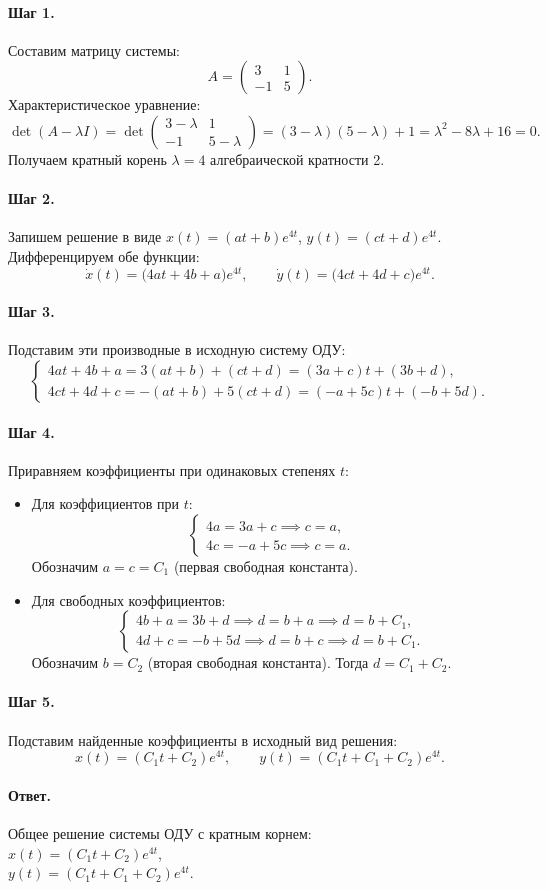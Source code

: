 \documentclass[12pt,a4paper]{article}
\theoremstyle{solution}
\newcommand{\answer}{\paragraph{Ответ.}}
\newcommand{\step}[1]{\paragraph{Шаг #1.}}
\begin{document}
\step{1} Составим матрицу системы:
\[
A = \begin{pmatrix} 3 & 1 \\ -1 & 5 \end{pmatrix}.
\]
Характеристическое уравнение:
\[
\det(A - \lambda I) = \det \begin{pmatrix} 3-\lambda & 1 \\ -1 & 5-\lambda \end{pmatrix} = (3-\lambda)(5-\lambda) + 1 = \lambda^2 - 8\lambda + 16 = 0.
\]
Получаем кратный корень $\lambda = 4$ алгебраической кратности 2.

\step{2} Запишем решение в виде $x(t) = (at + b)e^{4t}$, $y(t) = (ct + d)e^{4t}$. Дифференцируем обе функции:
\[
\dot{x}(t) = \big( 4at + 4b + a \big)e^{4t}, \qquad \dot{y}(t) = \big( 4ct + 4d + c \big)e^{4t}.
\]

\step{3} Подставим эти производные в исходную систему ОДУ:
\[
\begin{cases}
4at + 4b + a = 3(at + b) + (ct + d) = (3a + c)t + (3b + d), \\
4ct + 4d + c = -(at + b) + 5(ct + d) = (-a + 5c)t + (-b + 5d).
\end{cases}
\]

\step{4} Приравняем коэффициенты при одинаковых степенях $t$:
\begin{itemize}
    \item Для коэффициентов при $t$:
    \[
    \begin{cases}
    4a = 3a + c \implies c = a, \\
    4c = -a + 5c \implies c = a.
    \end{cases}
    \]
    Обозначим $a = c = C_1$ (первая свободная константа).
    \item Для свободных коэффициентов:
    \[
    \begin{cases}
    4b + a = 3b + d \implies d = b + a \implies d = b + C_1, \\
    4d + c = -b + 5d \implies d = b + c \implies d = b + C_1.
    \end{cases}
    \]
    Обозначим $b = C_2$ (вторая свободная константа). Тогда $d = C_1 + C_2$.
\end{itemize}

\step{5} Подставим найденные коэффициенты в исходный вид решения:
\[
x(t) = (C_1 t + C_2)e^{4t}, \qquad y(t) = (C_1 t + C_1 + C_2)e^{4t}.
\]

\answer
Общее решение системы ОДУ с кратным корнем: \\
$x(t) = (C_1 t + C_2) e^{4t}$, \\
$y(t) = (C_1 t + C_1 + C_2) e^{4t}$.
\end{document}
